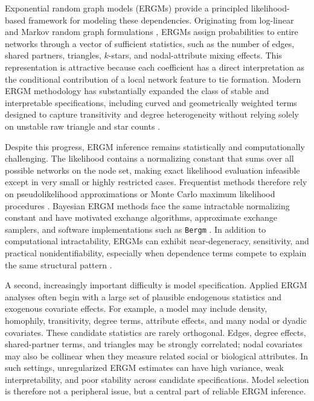 \documentclass[preprint,12pt,authoryear]{elsarticle}
\begin{document}
Exponential random graph models (ERGMs) provide a principled likelihood-based framework for modeling these dependencies. Originating from log-linear and Markov random graph formulations \citep{FrankStrauss1986,WassermanPattison1996}, ERGMs assign probabilities to entire networks through a vector of sufficient statistics, such as the number of edges, shared partners, triangles, \(k\)-stars, and nodal-attribute mixing effects. This representation is attractive because each coefficient has a direct interpretation as the conditional contribution of a local network feature to tie formation. Modern ERGM methodology has substantially expanded the class of stable and interpretable specifications, including curved and geometrically weighted terms designed to capture transitivity and degree heterogeneity without relying solely on unstable raw triangle and star counts \citep{Snijders2006,Robins2007intro,Hunter2008ergm,lusher2013}.


Despite this progress, ERGM inference remains statistically and computationally challenging. The likelihood contains a normalizing constant that sums over all possible networks on the node set, making exact likelihood evaluation infeasible except in very small or highly restricted cases. Frequentist methods therefore rely on pseudolikelihood approximations or Monte Carlo maximum likelihood procedures \citep{strauss1990pseudolikelihood,Snijders2002}. Bayesian ERGM methods face the same intractable normalizing constant and have motivated exchange algorithms, approximate exchange samplers, and software implementations such as \texttt{Bergm} \citep{CaimoFriel2011,Jin2013,CaimoFriel2014}. In addition to computational intractability, ERGMs can exhibit near-degeneracy, sensitivity, and practical nonidentifiability, especially when dependence terms compete to explain the same structural pattern \citep{Handcock2003,Snijders2006,ChatterjeeDiaconis2013}.


A second, increasingly important difficulty is model specification. Applied ERGM analyses often begin with a large set of plausible endogenous statistics and exogenous covariate effects. For example, a model may include density, homophily, transitivity, degree terms, attribute effects, and many nodal or dyadic covariates. These candidate statistics are rarely orthogonal. Edges, degree effects, shared-partner terms, and triangles may be strongly correlated; nodal covariates may also be collinear when they measure related social or biological attributes. In such settings, unregularized ERGM estimates can have high variance, weak interpretability, and poor stability across candidate specifications. Model selection is therefore not a peripheral issue, but a central part of reliable ERGM inference.
\end{document}
